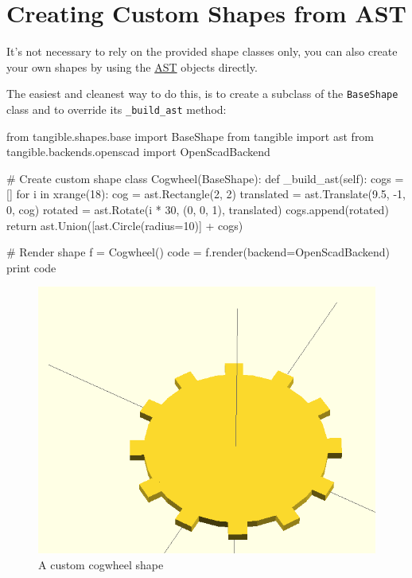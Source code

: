 \newpage
\section{Creating Custom Shapes from AST}\label{sec:custom_ast}

It's not necessary to rely on the provided shape classes only, you can also
create your own shapes by using the \hyperref[sec:ast]{AST} objects directly.

The easiest and cleanest way to do this, is to create a subclass of the
\texttt{BaseShape} class and to override its \texttt{\_build\_ast} method:

\vspace{.5\baselineskip}
\begin{pythoncode}
from tangible.shapes.base import BaseShape
from tangible import ast
from tangible.backends.openscad import OpenScadBackend

# Create custom shape
class Cogwheel(BaseShape):
    def _build_ast(self):
        cogs = []
        for i in xrange(18):
            cog = ast.Rectangle(2, 2)
            translated = ast.Translate(9.5, -1, 0, cog)
            rotated = ast.Rotate(i * 30, (0, 0, 1), translated)
            cogs.append(rotated)
        return ast.Union([ast.Circle(radius=10)] + cogs)

# Render shape
f = Cogwheel()
code = f.render(backend=OpenScadBackend)
print code
\end{pythoncode}
\vspace{.5\baselineskip}

\begin{figure}[H]
	\centering
	\includegraphics[height=.3\textheight]{images/cogwheel.png}
	\caption{A custom cogwheel shape}
	\label{img:cogwheel}
\end{figure}
